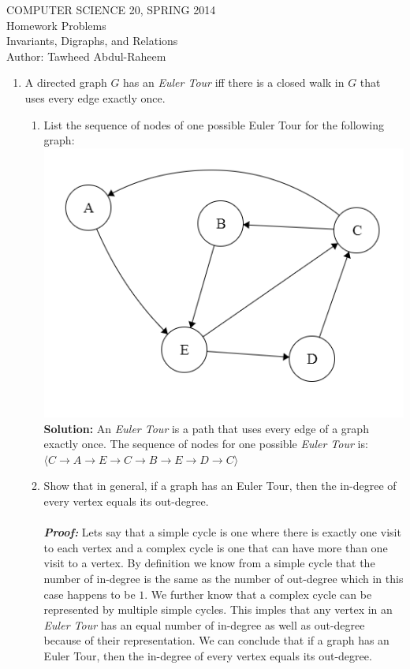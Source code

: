\documentclass[12pt]{article}
\begin{document}
\begin{center}
COMPUTER SCIENCE 20, SPRING 2014 \\
Homework Problems\\
Invariants, Digraphs, and Relations\\
Author: Tawheed Abdul-Raheem
\end{center}

\smallskip

\begin{enumerate}
\item A directed graph $G$ has an \textit{Euler Tour} iff there is a closed walk in $G$ that uses every edge exactly once. 
\begin{enumerate}
\item List the sequence of nodes of one possible Euler Tour for the following graph: \\
\includegraphics{eulertour}
\textbf{Solution: } An \textit{Euler Tour} is a path that uses every edge of a graph exactly once. The sequence of nodes for one possible \textit{Euler Tour} is: \\
$
\langle C \rightarrow A \rightarrow E \rightarrow C \rightarrow B \rightarrow E  \rightarrow D \rightarrow C\rangle
$
\item Show that in general, if a graph has an Euler Tour, then the in-degree of every vertex equals its out-degree.\\\\
    \textbf{\textit{Proof: }} Lets say that a simple cycle is one where there is exactly one visit to each vertex and a complex cycle is one that can have more than one visit to a vertex. By definition we know from a simple cycle that the number of in-degree is the same as the number of out-degree which in this case happens to be $1$. We further know that a complex cycle can be represented by multiple simple cycles. This imples that any vertex in an \textit{Euler Tour} has an equal number of in-degree as well as out-degree because of their representation. We can conclude that  if a graph has an Euler Tour, then the in-degree of every vertex equals its out-degree.


\end{enumerate}
\end{enumerate}
\end{document}
